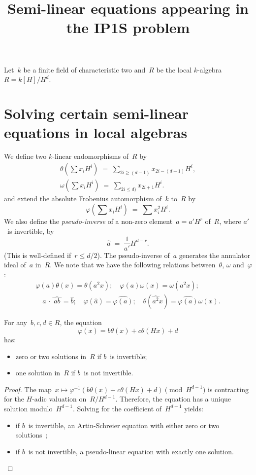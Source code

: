 \documentclass{llncs}
\begin{document}
\title{Semi-linear equations appearing in the IP1S problem}

Let~$k$ be a finite field of characteristic two and~$R$ be the local
$k$-algebra $R = k[H]/H^d$.
\section{Solving certain semi-linear equations in local algebras}%
We define two $k$-linear endomorphisms of~$R$
by
\begin{gather*}
θ(∑ x_i H^i) \;=\; ∑_{2i ≥ (d-1)} x_{2i-(d-1)} H^i,\\
ω(∑ x_i H^i) \;=\; ∑_{2i ≤ d)} x_{2i+1} H^{i}.
\end{gather*}
and extend the absolute Frobenius automorphism of~$k$ to~$R$ by
\begin{equation}
φ(∑ x_i H^i) \;=\; ∑ x_{i}^2 H^i.
\end{equation}
We also define the \emph{pseudo-inverse} of a non-zero element~$a = a'
H^r$ of~$R$, where $a'$~is invertible, by
\begin{equation}\label{eq:pseudo-inv}
\widehat{a} \;=\; \frac{1}{a'} H^{d-r}.
\end{equation}
(This is well-defined if~$r ≤ d/2$).
The pseudo-inverse of~$a$ generates the annulator ideal of~$a$ in~$R$.
We note that we have the following relations between~$θ$, $ω$ and~$φ$:
\begin{gather*}\label{eq:theta-omega}
φ(a) θ(x) = θ(a^2 x); \quad
φ(a) ω(x) = ω(a^2 x); \quad
\\
\quad a\,·\, \widehat{\,ab\,} = \widehat{b};\quad
φ(\widehat{a}) = \widehat{φ(a)};\quad
θ(\widehat{a^2} x) = \widehat{φ(a)} ω(x).
\end{gather*}


\begin{proposition}\label{prop:contracting}
For any~$b, c, d ∈ R$, the equation
\begin{equation}
φ(x) = b θ(x) + c θ(Hx) + d
\end{equation}
has:
\begin{itemize}
\item zero or two solutions in~$R$ if $b$~is invertible;
\item one solution in~$R$ if $b$~is not invertible.
\end{itemize}
\end{proposition}


\begin{proof}
The map~$x ↦  φ^{-1} (b θ(x) + c θ(Hx) + d) \pmod{H^{d-1}}$ is
contracting for the $H$-adic valuation on~$R/H^{d-1}$. Therefore, the
equation has a unique solution modulo~$H^{d-1}$. Solving for the
coefficient of~$H^{d-1}$ yields:
\begin{itemize}
\item if $b$~is invertible, an Artin-Schreier equation with either zero or
two solutions ;
\item if $b$~is not invertible, a pseudo-linear equation with exactly one
solution.
\end{itemize}
\end{proof}
\end{document}
